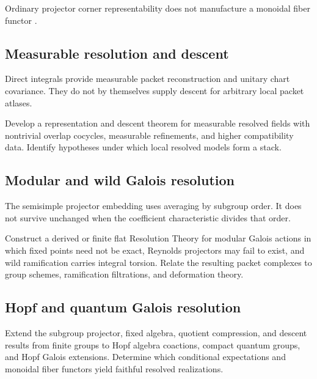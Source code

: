 \documentclass{aomart}
\theoremstyle{definition}
\theoremstyle{remark}
\newcommand{\Rcite}[1]{\cite{#1}}
\begin{document}
Ordinary projector corner representability does not manufacture a monoidal fiber functor \Rcite{R12}.

\subsection{Measurable resolution and descent}

Direct integrals provide measurable packet reconstruction and unitary chart covariance. They do not by themselves supply descent for arbitrary local packet atlases.

\begin{problem}\label{prob:measurable}
Develop a representation and descent theorem for measurable resolved fields with nontrivial overlap cocycles, measurable refinements, and higher compatibility data. Identify hypotheses under which local resolved models form a stack.
\end{problem}

\subsection{Modular and wild Galois resolution}

The semisimple projector embedding uses averaging by subgroup order. It does not survive unchanged when the coefficient characteristic divides that order.

\begin{problem}\label{prob:modular_galois}
Construct a derived or finite flat Resolution Theory for modular Galois actions in which fixed points need not be exact, Reynolds projectors may fail to exist, and wild ramification carries integral torsion. Relate the resulting packet complexes to group schemes, ramification filtrations, and deformation theory.
\end{problem}

\subsection{Hopf and quantum Galois resolution}

\begin{problem}\label{prob:hopf_galois}
Extend the subgroup projector, fixed algebra, quotient compression, and descent results from finite groups to Hopf algebra coactions, compact quantum groups, and Hopf Galois extensions. Determine which conditional expectations and monoidal fiber functors yield faithful resolved realizations.
\end{problem}
\end{document}
